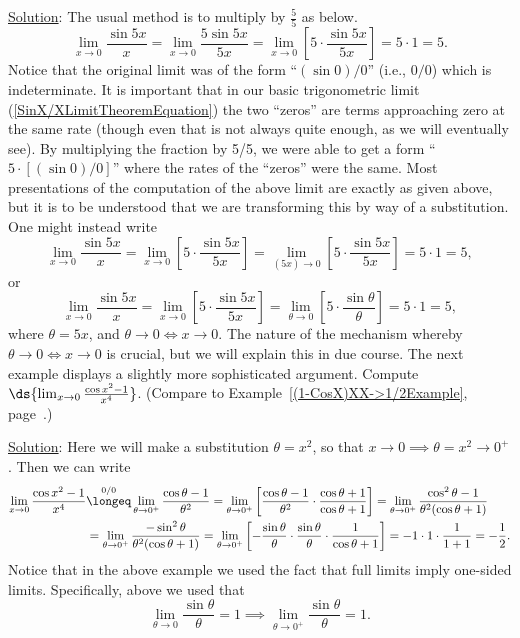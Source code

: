 \underline{Solution}: The usual method is to multiply by $\frac55$
as below.
$$\lim_{x\to0}\frac{\sin5x}x=\lim_{x\to0}\frac{5\sin5x}{5x}
   =\lim_{x\to0}\left[5\cdot\frac{\sin5x}{5x}\right]=5\cdot1=5.$$
\label{FirstSineSubstitionLimitExample}\eex
Notice that the original limit was of the form ``$(\sin0)/0$''
(i.e., $0/0$) which is indeterminate.  It is important that 
in our basic trigonometric limit (\ref{SinX/XLimitTheoremEquation})
the two ``zeros'' are terms approaching zero at the same rate
(though even that is not always quite enough, as we will eventually see).
By multiplying the fraction by 5/5, we were able to get a form
``$5\cdot[(\sin0)/0]$'' where the rates of the ``zeros'' were
the same.  Most presentations of the computation of the above 
limit are exactly as given above, but it is to be understood that
we are transforming this by way of a substitution.  One might 
instead write
$$\lim_{x\to0}\frac{\sin5x}x=\lim_{x\to0}\left[5\cdot\frac{\sin5x}{5x}\right]
  =\lim_{(5x)\to0}\left[5\cdot\frac{\sin5x}{5x}\right]
  =5\cdot1=5,$$
or
$$\lim_{x\to0}\frac{\sin5x}x=\lim_{x\to0}\left[5\cdot\frac{\sin5x}{5x}\right]
=\lim_{\theta\to0}\left[5\cdot\frac{\sin\theta}{\theta}\right]=5\cdot1=5,$$
where $\theta=5x$, and $\theta\to0\iff x\to0$.  The nature of the 
mechanism whereby $\theta\to0\iff x\to0$ is crucial, but we will 
explain this in due course.  The next example displays a slightly more
sophisticated argument.
\bex Compute $\ds{\lim_{x\to0}\frac{\cos x^2-1}{x^4}}$.  (Compare
to Example~\ref{(1-CosX)XX->1/2Example},
page~\pageref{(1-CosX)XX->1/2Example}.)

\underline{Solution}: Here we will make a substitution $\theta=x^2$,
so that $x\to0\implies\theta=x^2\to0^+$.  Then we can write
\begin{align*}\lim_{x\to0}\frac{\cos x^2-1}{x^4}
&\overset{0/0}{\longeq}\lim_{\theta\to0^+}\frac{\cos\theta-1}{\theta^2}
 =\lim_{\theta\to0^+}\left[\frac{\cos\theta-1}{\theta^2}\cdot
\frac{\cos\theta+1}{\cos\theta+1}\right]
=\lim_{\theta\to0^+}\frac{\cos^2\theta-1}{\theta^2(\cos\theta+1)}\\
&=\lim_{\theta\to0^+}\frac{-\sin^2\theta}{\theta^2(\cos\theta+1)}
=\lim_{\theta\to0^+}\left[-\frac{\sin\theta}\theta
 \cdot\frac{\sin\theta}\theta\cdot\frac1{\cos\theta+1}\right]
=-1\cdot1\cdot\frac1{1+1}=-\frac12.
\end{align*}\label{FirstCosineSubstitutionLimitExample}
\eex
Notice that in the above example we used the fact that
full limits imply one-sided limits.  Specifically, 
above we used that
$$\lim_{\theta\to0}\frac{\sin \theta}\theta
=1\implies \lim_{\theta\to0^+}\frac{\sin \theta}{\theta}=1.$$


